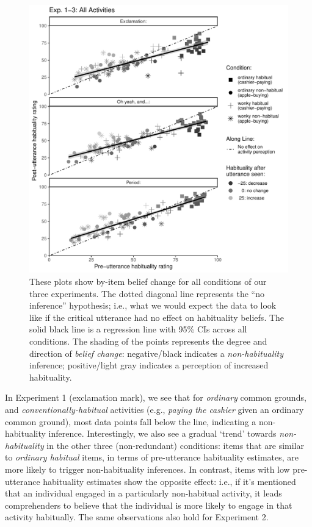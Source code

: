 \documentclass{sp}\usepackage[]{graphicx}\usepackage[]{color}
\makeatletter
\def\maxwidth{ %
  \ifdim\Gin@nat@width>\linewidth
    \linewidth
  \else
    \Gin@nat@width
  \fi
}
\newenvironment{knitrout}{}{} %
\makeatother
\begin{document}
\begin{knitrout}
\color{fgcolor}\begin{figure}
\includegraphics[width=\maxwidth]{figure/unnamed-chunk-69-1} \caption{\label{fig:grad}These plots show by-item belief change for all conditions of our three experiments. The dotted diagonal line represents the ``no inference'' hypothesis; i.e., what we would expect the data to look like if the critical utterance had no effect on habituality beliefs. The solid black line is a regression line with 95\% CIs across all conditions. The shading of the points represents the degree and direction of \textit{belief change}: negative/black indicates a \textit{non-habituality} inference; positive/light gray indicates a perception of increased habituality.}\label{fig:unnamed-chunk-69}
\end{figure}


\end{knitrout}

In Experiment 1 (exclamation mark), we see that for \textit{ordinary} common grounds, and \textit{conventionally-habitual} activities (e.g., \textit{paying the cashier} given an ordinary common ground), most data points fall below the line, indicating a non-habituality inference. Interestingly, we also see a gradual `trend' towards \textit{non-habituality} in the other three (non-redundant) conditions: items that are similar to \textit{ordinary habitual} items, in terms of pre-utterance habituality estimates, are more likely to trigger non-habituality inferences. In contrast, items with low pre-utterance habituality estimates show the opposite effect: i.e., if it's mentioned that an individual engaged in a particularly non-habitual activity, it leads comprehenders to believe that the individual is more likely to engage in that activity habitually. The same observations also hold for Experiment 2. 
\end{document}
